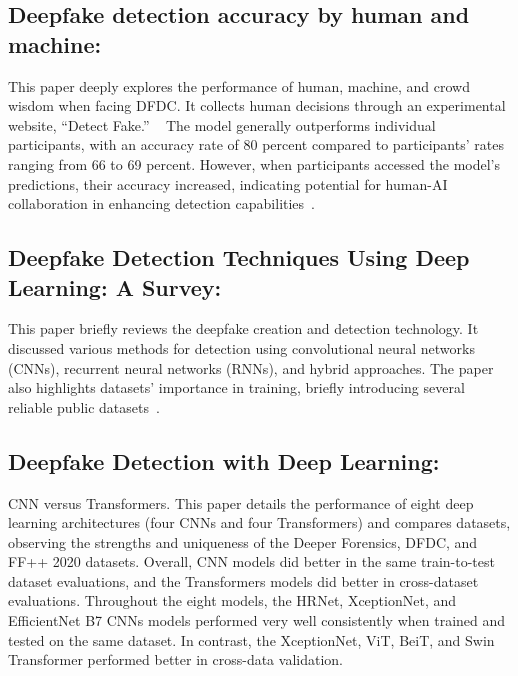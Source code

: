 \documentclass{article} %
\begin{document}
\subsection{Deepfake detection accuracy by human and machine:}

This paper deeply explores the performance of human, machine, and crowd wisdom when facing DFDC. It collects human decisions through an experimental website, “Detect Fake.” ~\citep{Fake_Deep} The model generally outperforms individual participants, with an accuracy rate of 80 percent compared to participants' rates ranging from 66 to 69 percent. However, when participants accessed the model's predictions, their accuracy increased, indicating potential for human-AI collaboration in enhancing detection capabilities~\citep{Matthew&Zip}.

\subsection{Deepfake Detection Techniques Using Deep Learning: A Survey:}

This paper briefly reviews the deepfake creation and detection technology. It discussed various methods for detection using convolutional neural networks (CNNs), recurrent neural networks (RNNs), and hybrid approaches. The paper also highlights datasets' importance in training, briefly introducing several reliable public datasets~\citep{Almars_2021}.

\subsection{Deepfake Detection with Deep Learning: }

CNN versus Transformers. This paper details the   performance of  eight deep learning architectures (four CNNs and four Transformers) and compares datasets, observing the strengths and uniqueness of the Deeper Forensics, DFDC, and FF++ 2020 datasets. Overall, CNN models did better in the same train-to-test dataset evaluations, and the Transformers models did better in cross-dataset evaluations. Throughout the eight models, the HRNet, XceptionNet, and EfficientNet B7 CNNs models performed very well consistently when trained and tested on the same dataset. In contrast, the XceptionNet, ViT, BeiT, and Swin Transformer performed better in cross-data validation.~\citep{Vrizlynn}

\end{document}
